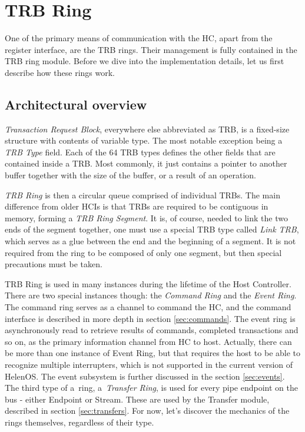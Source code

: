 \section{TRB Ring}

One of the primary means of communication with the HC, apart from the register
interface, are the TRB rings. Their management is fully contained in the TRB
ring module. Before we dive into the implementation details, let us first
describe how these rings work.

\subsection{Architectural overview}

\emph{Transaction Request Block}, everywhere else abbreviated as TRB, is
a fixed-size structure with contents of variable type. The most notable
exception being a \emph{TRB Type} field. Each of the 64 TRB types defines the
other fields that are contained inside a TRB. Most commonly, it just contains
a pointer to another buffer together with the size of the buffer, or a result
of an operation.

\emph{TRB Ring} is then a circular queue comprised of individual TRBs. The main
difference from older HCIs is that TRBs are required to be contiguous in
memory, forming a \emph{TRB Ring Segment}. It is, of course, needed to link the
two ends of the segment together, one must use a special TRB type called
\emph{Link TRB}, which serves as a glue between the end and the beginning of
a segment. It is not required from the ring to be composed of only one segment,
but then special precautions must be taken.

TRB Ring is used in many instances during the lifetime of the Host Controller.
There are two special instances though: the \emph{Command Ring} and the
\emph{Event Ring}. The command ring serves as a channel to command the HC, and
the command interface is described in more depth in section \ref{sec:commands}.
The event ring is asynchronously read to retrieve results of commands,
completed transactions and so on, as the primary information channel from HC to
host. Actually, there can be more than one instance of Event Ring, but that
requires the host to be able to recognize multiple interrupters, which is not
supported in the current version of HelenOS. The event subsystem is further
discussed in the section \ref{sec:events}. The third type of a~ring,
a~\emph{Transfer Ring}, is used for every pipe endpoint on the bus - either
Endpoint or Stream. These are used by the Transfer module, described in
section \ref{sec:transfers}. For now, let's discover the mechanics of the rings
themselves, regardless of their type.


